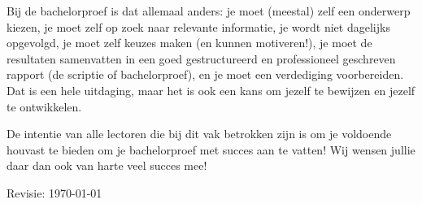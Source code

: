 Bij de bachelorproef is dat allemaal anders: je moet (meestal) zelf een onderwerp kiezen, je moet zelf op zoek naar relevante informatie, je wordt niet dagelijks opgevolgd, je moet zelf keuzes maken (en kunnen motiveren!), je moet de resultaten samenvatten in een goed gestructureerd en professioneel geschreven rapport (de scriptie of bachelorproef), en je moet een verdediging voorbereiden. Dat is een hele uitdaging, maar het is ook een kans om jezelf te bewijzen en jezelf te ontwikkelen.

De intentie van alle lectoren die bij dit vak betrokken zijn is om je voldoende houvast te bieden om je bachelorproef met succes aan te vatten! Wij wensen jullie daar dan ook van harte veel succes mee!

\bigskip
Revisie: \today